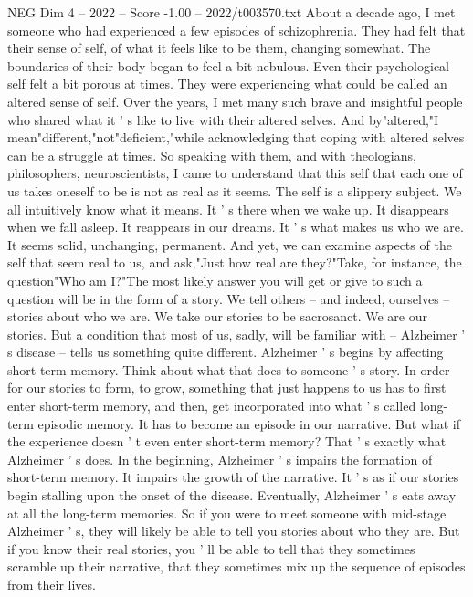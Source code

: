 \begin{textsample}{NEG Dim 4 – 2022 – Score -1.00 – 2022/t003570.txt}  \label{ex:f4_neg_055}
About a decade ago, I met someone who had experienced a few episodes of schizophrenia.
They had felt that their sense of self, of what it feels like to be them, changing somewhat.
The boundaries of their body began to feel a bit nebulous.
Even their psychological self felt a bit porous at times.
They were experiencing what could be called an altered sense of self.
Over the years, I met many such brave and insightful people who shared what it ' s like to live with their altered selves.
And by"altered,"I mean"different,"not"deficient,"while acknowledging that coping with altered selves can be a struggle at times.
So speaking with them, and with theologians, philosophers, neuroscientists, I came to understand that this self that each one of us takes oneself to be is not as real as it seems.
The self is a slippery subject.
We all intuitively know what it means.
It ' s there when we wake up.
It disappears when we fall asleep.
It reappears in our dreams.
It ' s what makes us who we are.
It seems solid, unchanging, permanent.
And yet, we can examine aspects of the self that seem real to us, and ask,"Just how real are they?"Take, for instance, the question"Who am I?"The most likely answer you will get or give to such a question will be in the form of a story.
We tell others -- and indeed, ourselves -- stories about who we are.
We take our stories to be sacrosanct.
We are our stories.
But a condition that most of us, sadly, will be familiar with -- Alzheimer ' s disease -- tells us something quite different.
Alzheimer ' s begins by affecting short-term memory.
Think about what that does to someone ' s story.
In order for our stories to form, to grow, something that just happens to us has to first enter short-term memory, and then, get incorporated into what ' s called long-term episodic memory.
It has to become an episode in our narrative.
But what if the experience doesn ' t even enter short-term memory?
That ' s exactly what Alzheimer ' s does.
In the beginning, Alzheimer ' s impairs the formation of short-term memory.
It impairs the growth of the narrative.
It ' s as if our stories begin stalling upon the onset of the disease.
Eventually, Alzheimer ' s eats away at all the long-term memories.
So if you were to meet someone with mid-stage Alzheimer ' s, they will likely be able to tell you stories about who they are.
But if you know their real stories, you ' ll be able to tell that they sometimes scramble up their narrative, that they sometimes mix up the sequence of episodes from their lives.

\end{textsample}
